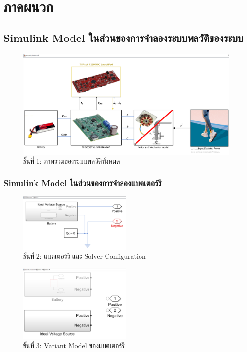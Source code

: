 \documentclass[11pt,a4paper]{article}
\begin{document}





\section{ภาคผนวก}

\subsection{Simulink Model ในส่วนของการจำลองระบบพลวัติของระบบ}

\begin{figure}[H]
    \centering
    \includegraphics[width=\textwidth]{layer0.png}
    \caption{ชั้นที่ 1: ภาพรวมของระบบพลวัติทั้งหมด}
\end{figure}

\subsubsection{Simulink Model ในส่วนของการจำลองแบตเตอร์รี}

\begin{figure}[H]
    \centering
    \includegraphics[width=0.5\textwidth]{layer1.png}
    \caption{ชั้นที่ 2: แบตเตอร์รี่ และ Solver Configuration}
\end{figure}

\begin{figure}[H]
    \centering
    \includegraphics[width=0.5\textwidth]{layer2-1.png}
    \caption{ขั้นที่ 3: Variant Model ของแบตเตอร์รี}
\end{figure}
\end{document}
